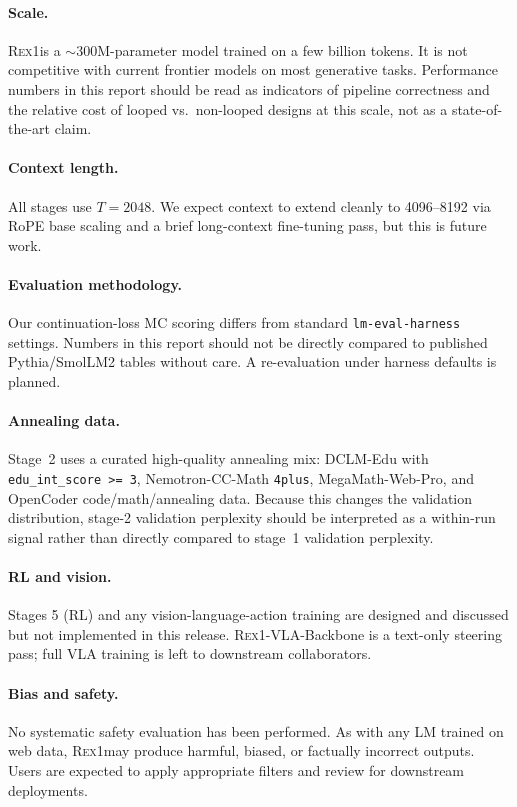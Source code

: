 \documentclass[11pt,a4paper]{article}
\newcommand{\REX}{\textsc{Rex1}\xspace}
\providecommand{\xspace}{}
\begin{document}
\paragraph{Scale.} \REX is a $\sim$300M-parameter model trained on a few
billion tokens. It is not competitive with current frontier models on most
generative tasks. Performance numbers in this report should be read as
indicators of pipeline correctness and the relative cost of looped vs.\
non-looped designs at this scale, not as a state-of-the-art claim.

\paragraph{Context length.} All stages use $T = 2048$. We expect context to
extend cleanly to 4096--8192 via RoPE base scaling and a brief long-context
fine-tuning pass, but this is future work.

\paragraph{Evaluation methodology.} Our continuation-loss MC scoring differs
from standard \texttt{lm-eval-harness} settings. Numbers in this report
should not be directly compared to published Pythia/SmolLM2 tables without
care. A re-evaluation under harness defaults is planned.

\paragraph{Annealing data.} Stage~2 uses a curated high-quality annealing mix:
DCLM-Edu with \texttt{edu\_int\_score >= 3}, Nemotron-CC-Math \texttt{4plus},
MegaMath-Web-Pro, and OpenCoder code/math/annealing data. Because this changes
the validation distribution, stage-2 validation perplexity should be
interpreted as a within-run signal rather than directly compared to stage~1
validation perplexity.

\paragraph{RL and vision.} Stages 5 (RL) and any vision-language-action
training are designed and discussed but not implemented in this release.
\REX-VLA-Backbone is a text-only steering pass; full VLA training is left to
downstream collaborators.

\paragraph{Bias and safety.} No systematic safety evaluation has been
performed. As with any LM trained on web data, \REX may produce harmful,
biased, or factually incorrect outputs. Users are expected to apply
appropriate filters and review for downstream deployments.
\end{document}

